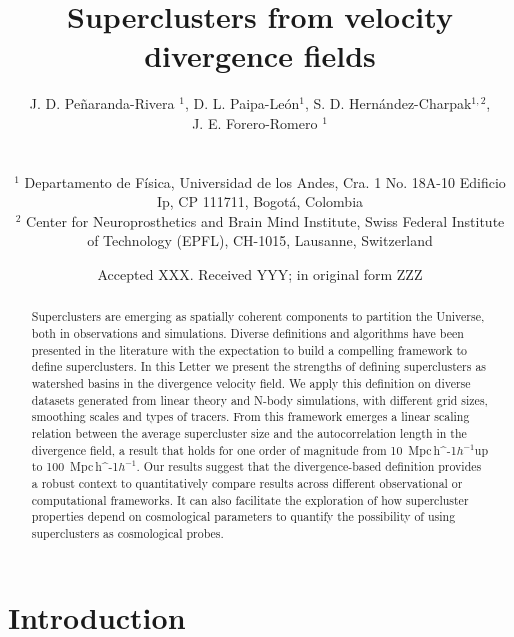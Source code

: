 \documentclass[usenatbib]{mnras}
\title[Superclusters from velocity divergence fields]{Superclusters from velocity divergence fields}
\author[Pe\~naranda-Rivera et al.]{
\parbox[t]{\textwidth}{
    {J. D. Pe\~naranda-Rivera $^1$,} 
    {D. L. Paipa-Le\'on$^{1}$,}
    {S. D. Hern\'andez-Charpak$^{1,2}$,}\\
    {J. E. Forero-Romero $^{1}$}
}
\\\\
$^{1}$ Departamento de F\'isica, Universidad de los Andes, Cra. 1
  No. 18A-10 Edificio Ip, CP 111711, Bogot\'a, Colombia \\
$^{2}$ Center for Neuroprosthetics and Brain Mind Institute, Swiss
  Federal Institute of Technology (EPFL), CH-1015, Lausanne,
  Switzerland\\  
}
\date{Accepted XXX. Received YYY; in original form ZZZ}
\newcommand{\Mpch}{\,{\rm Mpc}\,\ifmmode h^{-1}\else $h^{-1}$\fi}
\begin{document}
\label{firstpage}
\pagerange{\pageref{firstpage}--\pageref{lastpage}}
\maketitle

\maketitle
\begin{abstract}
Superclusters are emerging as spatially coherent components to partition the Universe, both in observations and simulations.
Diverse definitions and algorithms have been presented in the literature with the expectation to build a compelling framework to define superclusters.
In this Letter we present the strengths of defining superclusters as watershed basins in the divergence velocity field.
We apply this definition on diverse datasets generated from linear theory and  N-body simulations, with different grid sizes, smoothing scales and types of tracers.
From this framework emerges a linear scaling relation between the average supercluster size and the autocorrelation length in the divergence field, a result that holds for one order of magnitude from 10 \Mpch up to 100 \Mpch.
Our results suggest that the divergence-based definition provides a robust context to quantitatively compare results across different observational or computational frameworks. It can also facilitate the exploration of how supercluster properties depend on cosmological parameters to quantify the possibility of using superclusters as cosmological probes.
\end{abstract}

\begin{keywords}
\end{keywords}




\section{Introduction}
\end{document}
